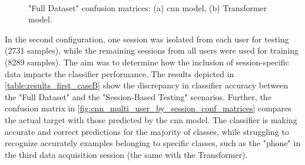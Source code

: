 \begin{figure}[ht]
    \centering
    \begin{subfigure}[b]{0.32\columnwidth}
        {\fontsize{8}{10}\selectfont}
        \caption{\centering}
    \end{subfigure} \
    \begin{subfigure}[b]{0.32\columnwidth}
        {\fontsize{8}{10}\selectfont}
        \caption{\centering}
    \end{subfigure}
    \caption[Multi-User Confusion matrices]{"Full Dataset" confusion matrices: (a) \acs{cnn} model, (b) Transformer model.}
    \label{fig:multi_user_conf_matrices}
\end{figure}

In the second configuration, one session was isolated from each user for testing (\num{2731} samples), while the remaining sessions from all users were used for training (\num{8289} samples). The aim was to determine how the inclusion of session-specific data impacts the classifier performance. The results depicted in \autoref{table:results_first_caseB} show the discrepancy in classifier accuracy between the "Full Dataset" and the "Session-Based Testing" scenarios. Further, the confusion matrix in \autoref{fig:cnn_multi_user_by_session_conf_matrices} compares the actual target with those predicted by the \acs{cnn} model. The classifier is making accurate and correct predictions for the majority of classes, while struggling to recognize accurately examples belonging to specific classes, such as the "phone" in the third data acquisition session (the same with the Transformer).

